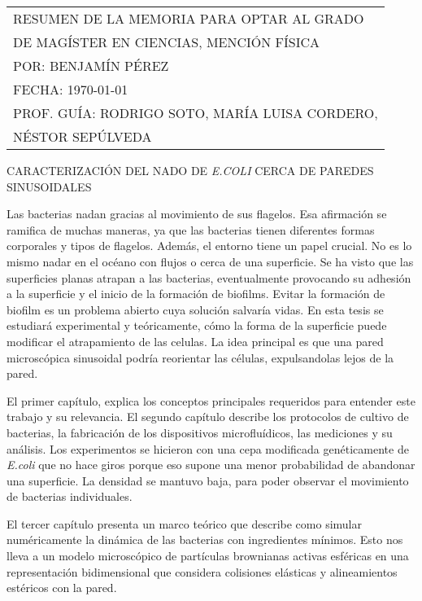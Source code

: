 \begin{adjustwidth}{4.2cm}{}
\begin{tabular}{l}
	RESUMEN DE LA MEMORIA PARA OPTAR AL GRADO\\
	DE MAGÍSTER EN CIENCIAS, MENCIÓN FÍSICA \\
	POR: BENJAMÍN PÉREZ \\
	FECHA: \MakeUppercase{\today} \\
	PROF. GUÍA: RODRIGO SOTO, MARÍA LUISA CORDERO, \\
	NÉSTOR SEPÚLVEDA\\
\end{tabular}
\end{adjustwidth}

\begin{center}
    \MakeUppercase{Caracterización del nado de \textit{E.coli} cerca de paredes sinusoidales }
\end{center}

Las bacterias nadan gracias al movimiento de sus flagelos. Esa afirmación se ramifica de muchas maneras, ya que las bacterias tienen diferentes formas corporales y tipos de flagelos. Además, el entorno tiene un papel crucial. No es lo mismo nadar en el océano con flujos o cerca de una superficie. Se ha visto que las superficies planas atrapan a las bacterias, eventualmente provocando su adhesión a la superficie y el inicio de la formación de biofilms. Evitar la formación de biofilm es un problema abierto cuya solución salvaría vidas. En esta tesis se estudiará experimental y teóricamente, cómo la forma de la superficie puede modificar el atrapamiento de las celulas. La idea principal es que una pared microscópica sinusoidal podría reorientar las células, expulsandolas lejos de la pared. 

El primer capítulo, explica los conceptos principales requeridos para entender este trabajo y su relevancia. El segundo capítulo describe los protocolos de cultivo de bacterias, la fabricación de los dispositivos microfluídicos, las mediciones y su análisis. Los experimentos se hicieron con una cepa modificada genéticamente de \textit{E.coli} que no hace giros porque eso supone una menor probabilidad de abandonar una superficie. La densidad se mantuvo baja, para poder observar el movimiento de bacterias individuales.

El tercer capítulo presenta un marco teórico que describe como simular numéricamente la dinámica de las bacterias con ingredientes mínimos. Esto nos lleva a un modelo microscópico de partículas brownianas activas esféricas en una representación bidimensional que considera colisiones elásticas y alineamientos estéricos con la pared.

